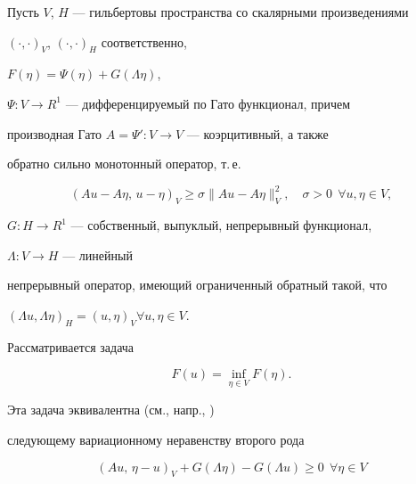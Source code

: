 Пусть $V$, $H$ --- гильбертовы пространства со скалярными произведениями


$(\cdot,\cdot)_V$, $(\cdot,\cdot)_H$ соответственно, 


$F(\eta)=\Psi (\eta)+G (\Lambda \eta)$,


$\Psi:V \to R^1$ --- дифференцируемый по Гато функционал, причем


производная Гато $A=\Psi':V\to V$ --- коэрцитивный, а также 


обратно сильно монотонный оператор, т.\,е. \cite{GT_89}


\begin{equation}


(A u-A \eta,\, u-\eta)_V \geq 


\sigma \|A u-A \eta\|_V^2, \quad \sigma > 0 


\ \ \forall u, \eta \in V,


\label{bz_01}


\end{equation}


$G: H \to R^1$ --- собственный, выпуклый, непрерывный функционал, 


$\Lambda : V \to H$ --- линейный


непрерывный оператор, имеющий ограниченный обратный такой, что


$(\Lambda u, \Lambda \eta)_H=(u, \eta)_V$\linebreak $\forall u , \eta \in V$.





Рассматривается задача 


\begin{equation}


F (u)=\inf_{\eta \in V} F(\eta).


\label{bz_02}


\end{equation}


Эта задача эквивалентна (см., напр., \cite{ET_79})


следующему вариационному неравенству второго рода


\begin{equation}


(A u ,\, \eta-u)_V+G (\Lambda \eta)-G (\Lambda u) \geq 0 


\ \ \forall \eta \in V


\label{bz_03}


\end{equation}


